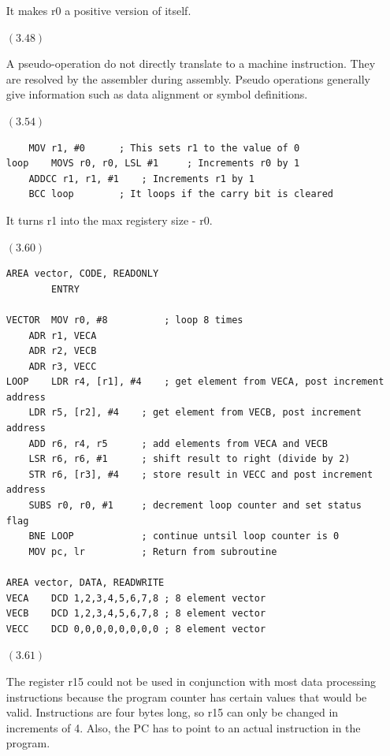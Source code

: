 \documentclass[letterpaper,10pt,titlepage]{article}
\begin{document}
\begin{enumerate}
  It makes r0 a positive version of itself.

\item[$(3.48)$]

  A pseudo-operation do not directly translate to a machine instruction.  They are resolved by the assembler during assembly.
  Pseudo operations generally give information such as data alignment or symbol definitions.
  
\item[$(3.54)$]

\begin{lstlisting}
	MOV r1, #0 		; This sets r1 to the value of 0
loop	MOVS r0, r0, LSL #1 	; Increments r0 by 1
	ADDCC r1, r1, #1	; Increments r1 by 1
	BCC loop		; It loops if the carry bit is cleared
\end{lstlisting}

  It turns r1 into the max registery size - r0.

\item[$(3.60)$]

\begin{lstlisting}
AREA vector, CODE, READONLY
		ENTRY

VECTOR	MOV r0, #8			; loop 8 times
	ADR r1, VECA
	ADR r2, VECB
	ADR r3, VECC
LOOP	LDR r4, [r1], #4	; get element from VECA, post increment address
	LDR r5, [r2], #4	; get element from VECB, post increment address
	ADD r6, r4, r5		; add elements from VECA and VECB
	LSR r6, r6, #1		; shift result to right (divide by 2)
	STR r6, [r3], #4	; store result in VECC and post increment address
	SUBS r0, r0, #1		; decrement loop counter and set status flag
	BNE LOOP			; continue untsil loop counter is 0
	MOV pc, lr			; Return from subroutine
		
AREA vector, DATA, READWRITE
VECA	DCD 1,2,3,4,5,6,7,8 ; 8 element vector
VECB	DCD 1,2,3,4,5,6,7,8 ; 8 element vector
VECC	DCD 0,0,0,0,0,0,0,0 ; 8 element vector
\end{lstlisting}
  
\item[$(3.61)$]

  The register r15 could not be used in conjunction with most data processing instructions because the program counter has certain values that would be valid.
  Instructions are four bytes long, so r15 can only be changed in increments of 4.  Also, the PC has to point to an actual instruction in the program.
  
\end{enumerate}
\end{document}
